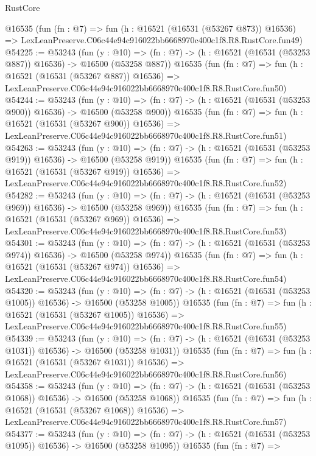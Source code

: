 \begin{lexlean}{RustCore}
\begin{coremodule}
    @16535
    (fun (fn : @7) =>
    fun (h : @16521 (@16531 (@53267 @873)) @16536) =>
    LexLeanPreserve.C06c44e94c916022bb6668970c400c1f8.R8.RustCore.fun49)
@54225 := @53243
    (fun (y : @10) =>
    (fn : @7) -> (h : @16521 (@16531 (@53253 @887)) @16536) -> @16500 (@53258 @887))
    @16535
    (fun (fn : @7) =>
    fun (h : @16521 (@16531 (@53267 @887)) @16536) =>
    LexLeanPreserve.C06c44e94c916022bb6668970c400c1f8.R8.RustCore.fun50)
@54244 := @53243
    (fun (y : @10) =>
    (fn : @7) -> (h : @16521 (@16531 (@53253 @900)) @16536) -> @16500 (@53258 @900))
    @16535
    (fun (fn : @7) =>
    fun (h : @16521 (@16531 (@53267 @900)) @16536) =>
    LexLeanPreserve.C06c44e94c916022bb6668970c400c1f8.R8.RustCore.fun51)
@54263 := @53243
    (fun (y : @10) =>
    (fn : @7) -> (h : @16521 (@16531 (@53253 @919)) @16536) -> @16500 (@53258 @919))
    @16535
    (fun (fn : @7) =>
    fun (h : @16521 (@16531 (@53267 @919)) @16536) =>
    LexLeanPreserve.C06c44e94c916022bb6668970c400c1f8.R8.RustCore.fun52)
@54282 := @53243
    (fun (y : @10) =>
    (fn : @7) -> (h : @16521 (@16531 (@53253 @969)) @16536) -> @16500 (@53258 @969))
    @16535
    (fun (fn : @7) =>
    fun (h : @16521 (@16531 (@53267 @969)) @16536) =>
    LexLeanPreserve.C06c44e94c916022bb6668970c400c1f8.R8.RustCore.fun53)
@54301 := @53243
    (fun (y : @10) =>
    (fn : @7) -> (h : @16521 (@16531 (@53253 @974)) @16536) -> @16500 (@53258 @974))
    @16535
    (fun (fn : @7) =>
    fun (h : @16521 (@16531 (@53267 @974)) @16536) =>
    LexLeanPreserve.C06c44e94c916022bb6668970c400c1f8.R8.RustCore.fun54)
@54320 := @53243
    (fun (y : @10) =>
    (fn : @7) -> (h : @16521 (@16531 (@53253 @1005)) @16536) -> @16500 (@53258 @1005))
    @16535
    (fun (fn : @7) =>
    fun (h : @16521 (@16531 (@53267 @1005)) @16536) =>
    LexLeanPreserve.C06c44e94c916022bb6668970c400c1f8.R8.RustCore.fun55)
@54339 := @53243
    (fun (y : @10) =>
    (fn : @7) -> (h : @16521 (@16531 (@53253 @1031)) @16536) -> @16500 (@53258 @1031))
    @16535
    (fun (fn : @7) =>
    fun (h : @16521 (@16531 (@53267 @1031)) @16536) =>
    LexLeanPreserve.C06c44e94c916022bb6668970c400c1f8.R8.RustCore.fun56)
@54358 := @53243
    (fun (y : @10) =>
    (fn : @7) -> (h : @16521 (@16531 (@53253 @1068)) @16536) -> @16500 (@53258 @1068))
    @16535
    (fun (fn : @7) =>
    fun (h : @16521 (@16531 (@53267 @1068)) @16536) =>
    LexLeanPreserve.C06c44e94c916022bb6668970c400c1f8.R8.RustCore.fun57)
@54377 := @53243
    (fun (y : @10) =>
    (fn : @7) -> (h : @16521 (@16531 (@53253 @1095)) @16536) -> @16500 (@53258 @1095))
    @16535
    (fun (fn : @7) =>

\end{coremodule}
\end{lexlean}
